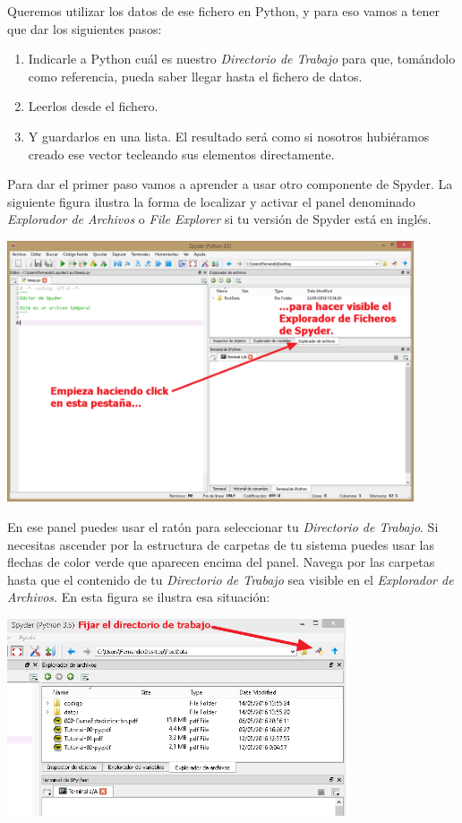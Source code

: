 \documentclass[10pt,a4paper]{article}\usepackage[]{graphicx}\usepackage[]{color}
\newcounter {cont01}
\begin{document}
Queremos utilizar los datos de ese fichero en Python, y para eso vamos a tener que dar los siguientes pasos:
\begin{enumerate}
\item Indicarle a Python cuál es nuestro {\em Directorio de Trabajo} para que, tomándolo como referencia, pueda saber llegar hasta el fichero de datos.
\item Leerlos desde el fichero. 
\item Y guardarlos en una lista. El resultado será como si nosotros hubiéramos creado ese vector tecleando sus elementos directamente.
\end{enumerate}

Para dar el primer paso vamos a aprender a usar otro componente de Spyder. La siguiente figura ilustra la forma de localizar y activar el panel denominado {\em Explorador de Archivos} o {\em File Explorer} si tu versión de Spyder está en inglés. 
\begin{center}
\includegraphics[width=12cm]{../fig/Tut-02-py-34-ExploradorFicherosSpyder01.png}
\end{center}
En ese panel puedes usar el ratón para seleccionar tu {\em Directorio de Trabajo}. Si necesitas ascender por la estructura de carpetas de tu sistema puedes usar las flechas de color verde que aparecen encima del panel. Navega por las carpetas hasta que el contenido de tu {\em Directorio de Trabajo} sea visible en el {\em Explorador de Archivos}. En esta figura se ilustra esa situación:
\begin{center}
\includegraphics[width=10cm]{../fig/Tut-02-py-35-ExploradorFicherosSpyder02.png}
\end{center}
\end{document}
